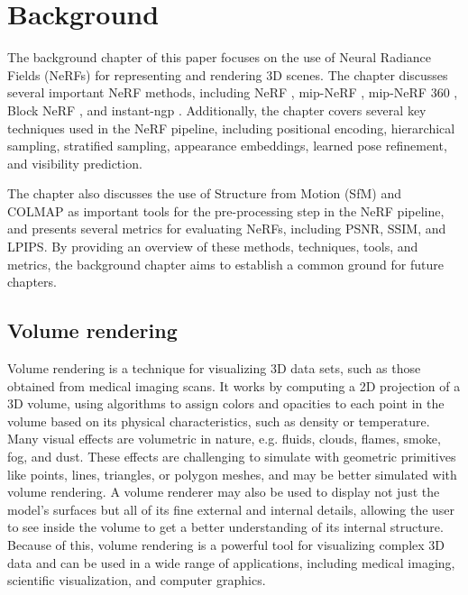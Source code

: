 \chapter{Background} \label{chap:relatedwork}

The background chapter of this paper focuses on the use of Neural Radiance Fields (NeRFs) for representing and rendering 3D scenes. The chapter discusses several important NeRF methods, including NeRF \cite{mildenhall_nerf_2020}, mip-NeRF \cite{barron_mip-nerf_2021}, mip-NeRF 360 \cite{barron_mip-nerf_2022}, Block NeRF \cite{tancik_block-nerf_2022}, and instant-ngp \cite{muller_instant_2022}. Additionally, the chapter covers several key techniques used in the NeRF pipeline, including positional encoding, hierarchical sampling, stratified sampling, appearance embeddings, learned pose refinement, and visibility prediction.

The chapter also discusses the use of Structure from Motion (SfM) and COLMAP \cite{schoenberger2016sfm} as important tools for the pre-processing step in the NeRF pipeline, and presents several metrics for evaluating NeRFs, including PSNR, SSIM, and LPIPS. By providing an overview of these methods, techniques, tools, and metrics, the background chapter aims to establish a common ground for future chapters.

\section{Volume rendering} \label{sec:volumerendering}
Volume rendering is a technique for visualizing 3D data sets, such as those obtained from medical imaging scans. It works by computing a 2D projection of a 3D volume, using algorithms to assign colors and opacities to each point in the volume based on its physical characteristics, such as density or temperature. Many visual effects are volumetric in nature, e.g. fluids, clouds, flames, smoke, fog, and dust. These effects are challenging to simulate with geometric primitives like points, lines, triangles, or polygon meshes, and may be better simulated with volume rendering. A volume renderer may also be used to display not just the model's surfaces but all of its fine external and internal details, allowing the user to see inside the volume to get a better understanding of its internal structure. Because of this, volume rendering is a powerful tool for visualizing complex 3D data and can be used in a wide range of applications, including medical imaging, scientific visualization, and computer graphics\cite{max_optical_1995}.

